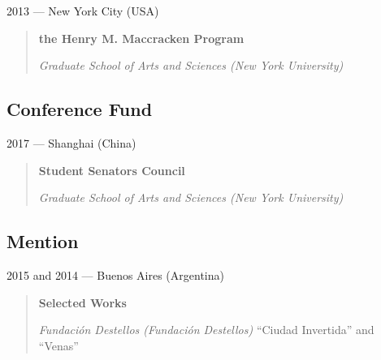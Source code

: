 \documentclass[12pt,overlapped]{res}%
\begin{document}
\begin{resume}
\begin{quote}
\end{quote}%


2013 --- New York City (USA)%
\begin{quote}
\par
\textbf{the Henry M. Maccracken Program}
\par
\textit{Graduate School of Arts and Sciences (New York University)}

\end{quote}%

%
%
%
\subsection{Conference Fund}%
2017 --- Shanghai (China)%
\begin{quote}
\par
\textbf{Student Senators Council}
\par
\textit{Graduate School of Arts and Sciences (New York University)}

\end{quote}%
%
%
%
\subsection{Mention}%
2015 and 2014 --- Buenos Aires (Argentina)%
%
\begin{quote}
\par
\textbf{Selected Works}
\par
\textit{Fundación Destellos (Fundación Destellos)}
``Ciudad Invertida'' and ``Venas''
\end{quote}%
%
%
%
%
%
%

%
%


\end{resume}
\end{document}
